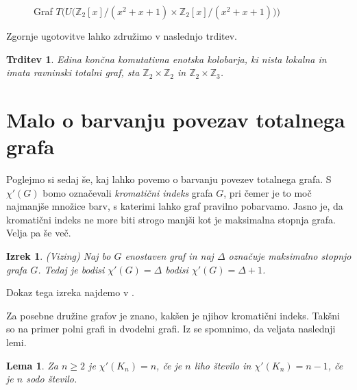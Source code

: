 \documentclass[a4paper, 12pt]{amsart}
\theoremstyle{definition} %
\theoremstyle{plain} %
\newtheorem{lema}[definicija]{Lema}
\newtheorem{izrek}[definicija]{Izrek}
\newtheorem{trditev}[definicija]{Trditev}
\newcommand{\Z}{\mathbb Z}
\begin{document}
\begin{enumerate}
\begin{figure}[h!]

\caption{Graf $T\big(U\big(\Z_2[x]/(x^2 + x + 1) \times \Z_2[x] / (x^2+x+1)\big)\big)$}
\label{T(U(R))}
\end{figure} 

\end{enumerate}

Zgornje ugotovitve lahko združimo v naslednjo trditev.

\begin{trditev}
Edina končna komutativna enotska kolobarja, ki nista lokalna in imata ravninski totalni graf, sta $\Z_2 \times \Z_2$ in $\Z_2 \times \Z_3$.
\end{trditev}

\section{Malo o barvanju povezav totalnega grafa}
Poglejmo si sedaj še, kaj lahko povemo o barvanju povezev totalnega grafa. S $\chi'(G)$ bomo označevali \emph{kromatični indeks} grafa $G$, pri čemer je to moč najmanjše množice barv, s katerimi lahko graf pravilno pobarvamo. Jasno je, da kromatični indeks ne more biti strogo manjši kot je maksimalna stopnja grafa. Velja pa še več.

\begin{izrek}(Vizing)
\label{Vizing}
Naj bo $G$ enostaven graf in naj $\Delta$ označuje maksimalno stopnjo grafa $G$. Tedaj je bodisi $\chi'(G) = \Delta$ bodisi $\chi'(G) = \Delta + 1$.
\end{izrek}
Dokaz tega izreka najdemo v \cite[Theorem 5.3.2]{Diestel}.

Za posebne družine grafov je znano, kakšen je njihov kromatični indeks. Takšni so na primer polni grafi in dvodelni grafi. Iz \cite{diploma} se spomnimo, da veljata naslednji lemi.
\begin{lema}
\label{grafKn}
Za $n\ge 2$ je $\chi'(K_n) = n$, če je $n$ liho število in $\chi'(K_n) = n-1$, če je $n$ sodo število.
\end{lema}
\end{document}
